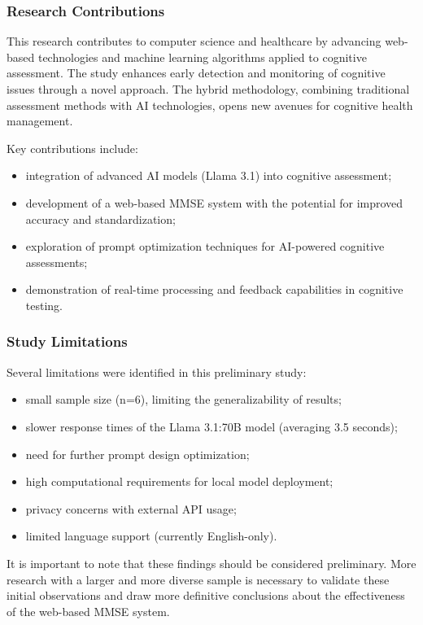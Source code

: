 \subsubsection{Research Contributions}
This research contributes to computer science and healthcare by advancing web-based technologies and machine learning algorithms applied to cognitive assessment. The study enhances early detection and monitoring of cognitive issues through a novel approach. The hybrid methodology, combining traditional assessment methods with AI technologies, opens new avenues for cognitive health management.

Key contributions include:
\begin{itemize}
\item integration of advanced AI models (Llama 3.1) into cognitive assessment;
\item development of a web-based MMSE system with the potential for improved accuracy and standardization;
\item exploration of prompt optimization techniques for AI-powered cognitive assessments;
\item demonstration of real-time processing and feedback capabilities in cognitive testing.
\end{itemize}
\subsubsection{Study Limitations}
Several limitations were identified in this preliminary study:
\begin{itemize}
\item small sample size (n=6), limiting the generalizability of results;
\item slower response times of the Llama 3.1:70B model (averaging 3.5 seconds);
\item need for further prompt design optimization;
\item high computational requirements for local model deployment;
\item privacy concerns with external API usage;
\item limited language support (currently English-only).
\end{itemize}

It is important to note that these findings should be considered preliminary. More research with a larger and more diverse sample is necessary to validate these initial observations and draw more definitive conclusions about the effectiveness of the web-based MMSE system.

